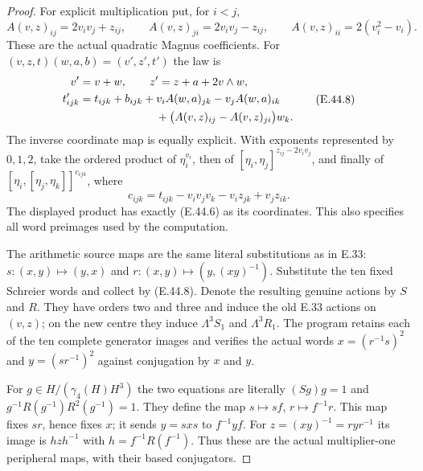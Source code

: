 \begin{proof}
For explicit multiplication put, for $i<j$,
\[
 A(v,z)_{ij}=2v_iv_j+z_{ij},\qquad
 A(v,z)_{ji}=2v_iv_j-z_{ij},\qquad
 A(v,z)_{ii}=2(v_i^2-v_i).
 \tag{E.44.7}
\]
These are the actual quadratic Magnus coefficients.
For $(v,z,t)(w,a,b)=(v',z',t')$ the law is
\[
 \begin{split}
 v'&=v+w,\qquad z'=z+a+2v\wedge w,\\
 t'_{ijk}&=t_{ijk}+b_{ijk}
       +v_i A(w,a)_{jk}-v_j A(w,a)_{ik}\\
   &\hspace{24mm}
       +\bigl(A(v,z)_{ij}-A(v,z)_{ji}\bigr)w_k.
 \end{split}
 \tag{E.44.8}
\]
The inverse coordinate map is equally explicit.
With exponents represented by $0,1,2$, take the
ordered product of $\eta_i^{v_i}$, then of
$[\eta_i,\eta_j]^{z_{ij}-2v_iv_j}$, and finally
of $[\eta_i,[\eta_j,\eta_k]]^{c_{ijk}}$, where
\[
          c_{ijk}=t_{ijk}-v_iv_jv_k-v_i z_{jk}+v_j z_{ik}.
 \tag{E.44.9}
\]
The displayed product has exactly \textup{(E.44.6)}
as its coordinates.  This also specifies all
word preimages used by the computation.

The arithmetic source maps are the same literal
substitutions as in E.33:
$s:(x,y)\mapsto(y,x)$ and
$r:(x,y)\mapsto(y,(xy)^{-1})$.
Substitute the ten fixed Schreier words and collect
by \textup{(E.44.8)}.  Denote the resulting genuine
actions by $S$ and $R$.  They have orders two and
three and induce the old E.33 actions on $(v,z)$;
on the new centre they induce
$\Lambda^3 S_1$ and $\Lambda^3 R_1$.
The program retains each of the ten complete
generator images and verifies the actual words
$x=(r^{-1}s)^2$ and $y=(sr^{-1})^2$ against
conjugation by $x$ and $y$.

For $g\in H/(\gamma_4(H)H^3)$ the two equations are
literally $(Sg)g=1$ and
$g^{-1}R(g^{-1})R^2(g^{-1})=1$.
They define the map $s\mapsto sf$, $r\mapsto f^{-1}r$.
This map fixes $sr$, hence fixes $x$; it sends
$y=sxs$ to $f^{-1}yf$.
For $z=(xy)^{-1}=ryr^{-1}$ its image is
$hzh^{-1}$ with $h=f^{-1}R(f^{-1})$.
Thus these are the actual multiplier-one peripheral
maps, with their based conjugators.


\end{proof}
